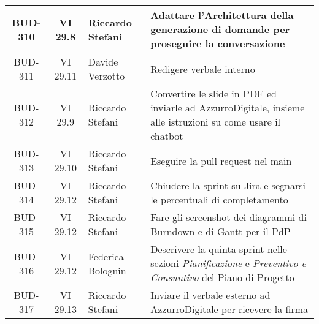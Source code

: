 \begin{table}[htbp]
\begin{tabular}{|c|c|p{}|p{}|}
    \hline
    BUD-310 & VI 29.8 & Riccardo Stefani & Adattare l'Architettura della generazione di domande per proseguire la conversazione\\
    \hline
    BUD-311 & VI 29.11 & Davide Verzotto & Redigere verbale interno \\
    \hline
    BUD-312 & VI 29.9 & Riccardo Stefani & Convertire le slide in PDF ed inviarle ad AzzurroDigitale, insieme alle istruzioni su come usare il chatbot \\
    \hline
    BUD-313 & VI 29.10 & Riccardo Stefani & Eseguire la pull request nel main \\
    \hline
    BUD-314 & VI 29.12 & Riccardo Stefani & Chiudere la sprint su Jira e segnarsi le percentuali di completamento \\
    \hline
    BUD-315 & VI 29.12 & Riccardo Stefani & Fare gli screenshot dei diagrammi di Burndown e di Gantt per il PdP \\
    \hline
    BUD-316 & VI 29.12 & Federica Bolognin & Descrivere la quinta sprint nelle sezioni \emph{Pianificazione} e \emph{Preventivo e Consuntivo} del Piano di Progetto\\
    \hline
    BUD-317 & VI 29.13 & Riccardo Stefani & Inviare il verbale esterno ad AzzurroDigitale per ricevere la firma\\
    \hline

\end{tabular}
\end{table}